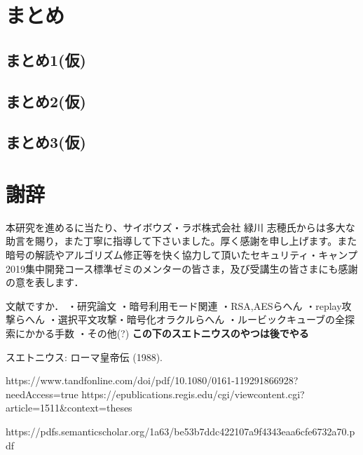 \documentclass{jsarticle}
\begin{document}
\section{まとめ}
\subsection{まとめ1(仮)}
\subsection{まとめ2(仮)}
\subsection{まとめ3(仮)}
\section{謝辞}
本研究を進めるに当たり、サイボウズ・ラボ株式会社 緑川 志穂氏からは多大な助言を賜り，また丁寧に指導して下さいました。厚く感謝を申し上げます。また暗号の解読やアルゴリズム修正等を快く協力して頂いたセキュリティ・キャンプ2019集中開発コース標準ゼミのメンターの皆さま，及び受講生の皆さまにも感謝の意を表します．

\newpage 
文献ですか．
・研究論文
・暗号利用モード関連
・RSA,AESらへん
・replay攻撃らへん
・選択平文攻撃・暗号化オラクルらへん
・ルービックキューブの全探索にかかる手数
・その他(?)
\LARGE
\bf{この下のスエトニウスのやつは後でやる\\}
\normalsize
\begin{thebibliography}{}

 スエトニウス: ローマ皇帝伝 (1988). 

 https://www.tandfonline.com/doi/pdf/10.1080/0161-119291866928?needAccess=true
 https://epublications.regis.edu/cgi/viewcontent.cgi?article=1511\&context=theses

https://pdfs.semanticscholar.org/1a63/be53b7ddc422107a9f4343eaa6cfe6732a70.pdf

\end{thebibliography}
\end{document}
